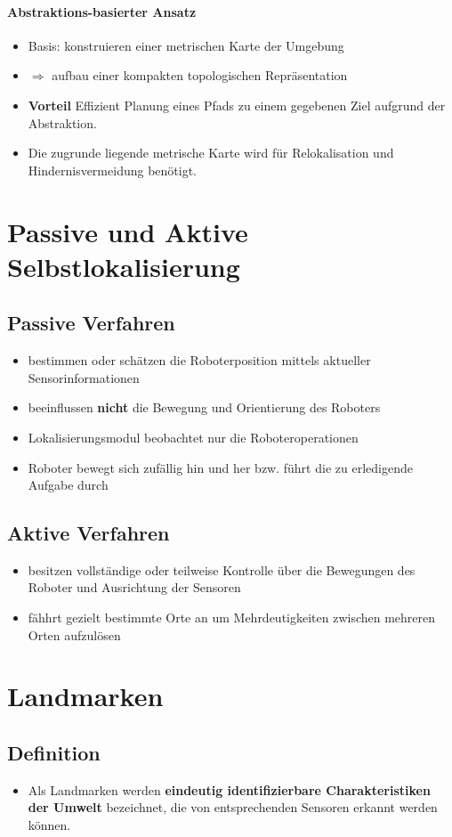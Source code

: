 \paragraph{Abstraktions-basierter Ansatz}
\begin{itemize}
	\item Basis: konstruieren einer metrischen Karte der Umgebung
	\item $\Rightarrow$ aufbau einer kompakten topologischen Repräsentation
	\item \textbf{Vorteil} Effizient Planung eines Pfads zu einem gegebenen Ziel aufgrund der Abstraktion.
	\item Die zugrunde liegende metrische Karte wird für Relokalisation und Hindernisvermeidung benötigt.
\end{itemize}
\section{Passive und Aktive Selbstlokalisierung}
\subsection{Passive Verfahren}
\begin{itemize}
	\item bestimmen oder schätzen die Roboterposition mittels aktueller Sensorinformationen
	\item beeinflussen \textbf{nicht} die Bewegung und Orientierung des Roboters
	\item Lokalisierungsmodul beobachtet nur die Roboteroperationen
	\item Roboter bewegt sich zufällig hin und her bzw. führt die zu erledigende Aufgabe durch
\end{itemize}
\subsection{Aktive Verfahren}
\begin{itemize}
	\item besitzen vollständige oder teilweise Kontrolle über die Bewegungen des Roboter und Ausrichtung der Sensoren
	\item fähhrt gezielt bestimmte Orte an um Mehrdeutigkeiten zwischen mehreren Orten aufzulösen
\end{itemize}
\section{Landmarken}
\subsection{Definition}
\begin{itemize}
	\item Als Landmarken werden \textbf{eindeutig identifizierbare Charakteristiken der Umwelt} bezeichnet, die von entsprechenden Sensoren erkannt werden können.
\end{itemize}
